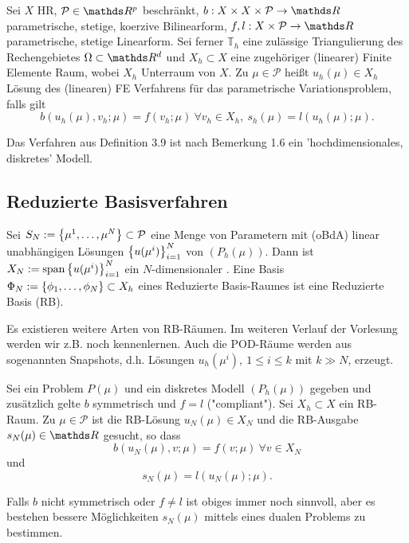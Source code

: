 Sei $X$ HR, $\mathcal{P}\in \R^p$ beschränkt, $b:X\times X\times \mathcal{P}\to \R$ parametrische, stetige, koerzive Bilinearform, $f,l:X\times \mathcal{P}\to \R$ parametrische, stetige Linearform.
Sei ferner $\mathbb{T}_h$ eine zulässige Triangulierung des Rechengebietes $\Omega\subset \R^d$ und $X_h\subset X$ eine zugehöriger (linearer) Finite Elemente Raum, wobei $X_h$ Unterraum von $X$.
Zu $\mu\in\mathcal{P}$ heißt $u_h(\mu)\in X_h$ Lösung des (linearen) FE Verfahrens für das parametrische Variationsproblem, falls gilt
\[
b(u_h(\mu),v_h;\mu) = f(v_h;\mu) ~\forall v_h\in X_h,~ s_h(\mu)= l(u_h(\mu);\mu).
\]

Das Verfahren aus Definition 3.9 ist nach Bemerkung 1.6 ein 'hochdimensionales, diskretes' Modell.

\subsection{Reduzierte Basisverfahren}

Sei $S_N := \left\{\mu^1, \dots ,\mu^N\right\}\subset \mathcal{P}$ eine Menge von Parametern mit (oBdA) linear unabhängigen Lösungen $\left\{u(\mu^i)\right\}_{i=1}^N$ von $(P_h(\mu))$.
Dann ist $X_N := \operatorname{span}\left\{u(\mu^i)\right\}_{i=1}^N$ ein $N$-dimensionaler .
Eine Basis $\Phi_N :=\left\{\phi_1, \dots ,\phi_N\right\}\subset X_h$ eines Reduzierte Basis-Raumes ist eine Reduzierte Basis (RB).

Es existieren weitere Arten von RB-Räumen.
Im weiteren Verlauf der Vorlesung werden wir z.B. noch  kennenlernen.
Auch die POD-Räume werden aus sogenannten Snapshots, d.h. Lösungen $u_h(\mu^i),~1\le i\le k$ mit $k\gg N$, erzeugt.

Sei ein Problem $P(\mu)$ und ein diskretes Modell $(P_h(\mu))$ gegeben und zusätzlich gelte $b$ symmetrisch und $f=l$ ("compliant").
Sei $X_h\subset X$ ein RB-Raum.
Zu $\mu \in \mathcal{P}$ ist die RB-Lösung $u_N(\mu)\in X_N$ und die RB-Ausgabe $s_N(\mu)\in \R$ gesucht, so dass
\[
b(u_N(\mu),v;\mu) = f(v;\mu) ~\forall v\in X_N
\]
und 
\[
s_N(\mu) = l(u_N(\mu);\mu).
\]

Falls $b$ nicht symmetrisch oder $f\neq l$ ist obiges immer noch sinnvoll, aber es bestehen bessere Möglichkeiten $s_N(\mu)$ mittels eines dualen Problems zu bestimmen.

